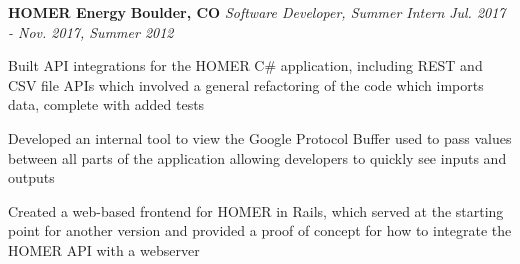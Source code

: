 \item
\headerrow
{\textbf{HOMER Energy}}
{\textbf{Boulder, CO}}
\headerrow
{\emph{Software Developer, Summer Intern}}
{\emph{Jul. 2017 - Nov. 2017, Summer 2012}}
\begin{itemize*}
    \item Built API integrations for the HOMER C\# application, including REST
    and CSV file APIs which involved a general refactoring of the code which
    imports data, complete with added tests
    \item Developed an internal tool to view the Google Protocol Buffer used to
    pass values between all parts of the application allowing developers to
    quickly see inputs and outputs
    \item Created a web-based frontend for HOMER in Rails, which served at the
    starting point for another version and provided a proof of concept for
    how to integrate the HOMER API with a webserver
\end{itemize*}
